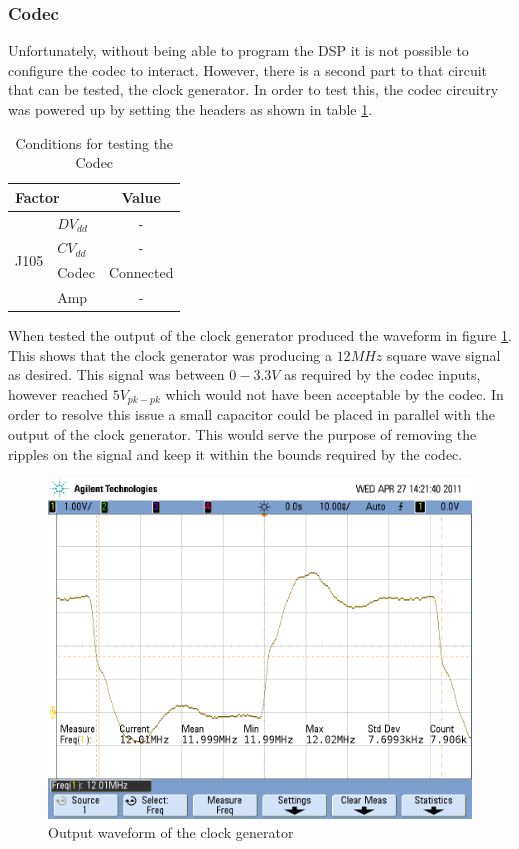 \subsubsection{Codec}
Unfortunately, without being able to program the DSP it is not possible to configure the codec to interact.
However, there is a second part to that circuit that can be tested, the clock generator.
In order to test this, the codec circuitry was powered up by setting the headers as shown in table \ref{tab:codectestconditions}.

\begin{table}[H]
	\centering
	\begin{tabular}[c]{| l | l | c |}
		\hline
		\multicolumn{2}{|l|}{Factor}		& Value	\\
		\hline
		\multirow{4}{*}{J105}	& $DV_{dd}$	& -		\\
					& $CV_{dd}$	& -		\\
					& Codec		& Connected	\\
					& Amp		& -		\\
		\hline
	\end{tabular}
	\caption{Conditions for testing the Codec}
	\label{tab:codectestconditions}
\end{table}

\noindent When tested the output of the clock generator produced the waveform in figure \ref{fig:codec12Mclk}.
This shows that the clock generator was producing a $12MHz$ square wave signal as desired.
This signal was between $0-3.3V$ as required by the codec inputs, however reached $5V_{pk-pk}$ which would not have been acceptable by the codec.
In order to resolve this issue a small capacitor could be placed in parallel with the output of the clock generator.
This would serve the purpose of removing the ripples on the signal and keep it within the bounds required by the codec.

\begin{figure}[H]
	\centering
	\includegraphics[width=\textwidth]{./img/codec_12M_clk.png}
	\caption{Output waveform of the clock generator}
	\label{fig:codec12Mclk}
\end{figure}

